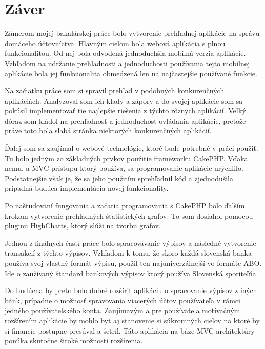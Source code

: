 \documentclass[12pt,oneside]{book}
\begin{document}
\chapter{Záver}\label{chap:outro}
 
Zámerom mojej bakalárskej práce bolo vytvorenie prehľadnej aplikácie na správu domáceho účtovníctva. Hlavným cieľom bola webová aplikácia s plnou funkcionalitou. Od nej bola odvodená jednoduchšia mobilná verzia aplikácie. Vzhľadom na udržanie prehľadnosti a jednoduchosti používania tejto mobilnej aplikácie bola jej funkcionalita obmedzená len na najčastejšie používané funkcie.

Na začiatku práce som si spravil prehľad v podobných konkurenčných aplikáciách. Analyzoval som ich klady a zápory a do svojej aplikácie som sa pokúsil implementovať tie najlepšie riešenia z týchto rôznych aplikácií. Veľký dôraz som kládol na prehľadnosť a jednoduchosť ovládania aplikácie, pretože práve toto bola slabá stránka niektorých konkurenčných aplikácií. 

Ďalej som sa zaujímal o webové technológie, ktoré bude potrebné v práci použiť. Tu bolo jedným zo základných prvkov použitie frameworku CakePHP. Vďaka nemu, a MVC prístupu ktorý používa, sa programovanie aplikácie urýchlilo. Podstatnejšie však je, že sa jeho použitím sprehľadnil kód a zjednodušila prípadná budúca implementácia novej funkcionality. 

Po naštudovaní fungovania a začatia programovania s CakePHP bolo ďalším krokom vytvorenie prehľadných štatistických grafov. To som dosiahol pomocou pluginu HighCharts, ktorý slúži na tvorbu grafov. 

Jednou z finálnych častí práce bolo spracovávanie výpisov a následné vytvorenie transakcií z týchto výpisov. Vzhľadom k tomu, že skoro každá slovenská banka používa svoj vlastný formát výpisu, použil ten najuniverzálnejší vo formáte ABO. Ide o zaužívaný štandard bankových výpisov ktorý používa Slovenská sporiteľňa. 

Do budúcna by preto bolo dobré rozšíriť aplikáciu o spracovanie výpisov z iných bánk, prípadne o možnosť spravovania viacerých účtov používateľa v rámci jedného používateľského konta. Zaujímavým a pre používateľa motivačným rozšírením aplikácie by mohlo byť aj stanovenie si súkromných cieľov na ktoré by si financie postupne presúval a šetril. Táto aplikácia na báze MVC architektúry ponúka skutočne široké možnosti rozšírenia.

\backmatter

\nocite{*}


\end{document}
